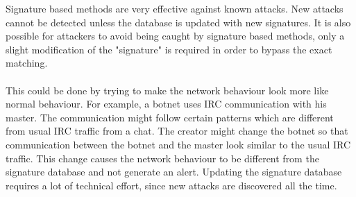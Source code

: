 Signature based methods are very effective against known attacks. New attacks cannot be detected unless the database is updated with new signatures. It is also possible for attackers to avoid being caught by signature based methods, only a slight modification of the "signature" is required in order to bypass the exact matching. \cite{IPFlow}\\
\\
This could be done by trying to make the network behaviour look more like normal behaviour. For example, a botnet uses IRC communication with his master. The communication might follow certain patterns which are different from usual IRC traffic from a chat. The creator might change the botnet so that communication between the botnet and the master look similar to the usual IRC traffic. This change causes the network behaviour to be different from the signature database and not generate an alert. Updating the signature database requires a lot of technical effort, since new attacks are discovered all the time.\cite{methods} \cite{uddin2013intrusion}
